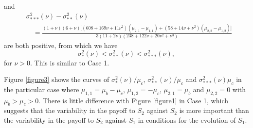 \documentclass[11pt]{article}
\begin{document}
and
\begin{align}\label{sec5-case3-eq5bis}
&\sigma^2_{***}(\nu)-\sigma^2_{**}(\nu)\nonumber\\
&\quad=\frac{
(1+\nu) (6+\nu)\Big[(608+169\nu+11\nu^2)(\mu_{2,1}-\mu_{1,1})
+(58+14\nu+\nu^2)(\mu_{2,2}-\mu_{1,2})\Big]
}{3(11+2\nu)(238+122\nu+20\nu^2+\nu^3)}
\end{align}
are both positive, from which  we have
\begin{equation}\label{sec5-case3-eq6}
\sigma^2_{*}(\nu)<\sigma^2_{**}(\nu)<\sigma^2_{***}(\nu),
\end{equation}
for $\nu>0$. This is similar to Case 1.

Figure \ref{figure3} shows the curves of $\sigma^2_{*}(\nu)/\mu_c$, $\sigma^2_{**}(\nu)/\mu_c$ and $\sigma^2_{***}(\nu)\mu_c$
in the particular case where
$\mu_{1,1}=\mu_b-\mu_c$, $\mu_{1,2}=-\mu_c$, $\mu_{2,1}=\mu_b$ and $\mu_{2,2}=0$ with $\mu_b>\mu_c>0$. There is little difference with Figure \ref{figure1} in Case 1, which suggests that the variability in the payoff to $S_2$ against $S_2$ is more important than the variability in the payoff to $S_2$ against $S_1$ in conditions for the evolution of $S_1$. 
\end{document}
